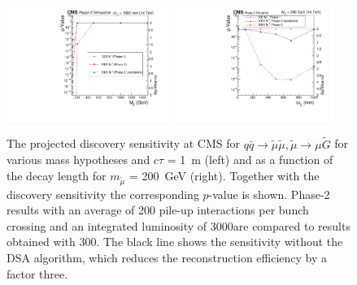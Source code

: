 \begin{figure}[t]\begin{center}
\includegraphics[width=0.47\textwidth]{figures/SignificanceComp.pdf}
\includegraphics[width=0.47\textwidth]{figures/SignificanceComp_asfuncofCtau.pdf}
\caption{The projected discovery sensitivity at CMS for  $q \bar q \to \widetilde{\mu} \widetilde{\mu}, \widetilde{\mu}\rightarrow \mu\widetilde{G}$ for various mass hypotheses and $c\tau$ = 1~m (left) and as a function of the decay length for $m_{\widetilde{\mu}}$ = 200~GeV (right). Together with the discovery sensitivity the corresponding $p$-value is shown. Phase-2 results with an average of 200 pile-up interactions per bunch crossing and an integrated luminosity of 3000\fbinv are compared to results obtained with 300\fbinv. The black line shows the sensitivity without the DSA algorithm, which reduces the reconstruction efficiency by a factor three.
 }
\label{fig:displResultsSensitiviy}
\end{center}
\end{figure}


